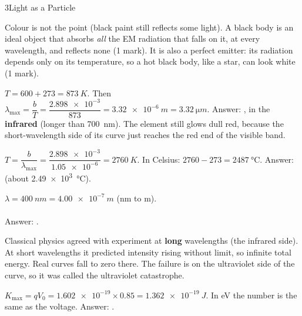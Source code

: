 \begin{chapteranswers}{3}{Light as a Particle}
  \item Colour is not the point (black paint still reflects some light). A black
        body is an ideal object that absorbs \emph{all} the EM radiation that falls on
        it, at every wavelength, and reflects none (1 mark). It is also a perfect
        emitter: its radiation depends only on its temperature, so a hot black body,
        like a star, can look white (1 mark).
  \item $T = 600 + 273 = \qty{873}{K}$. Then
        $\lambda_\mathrm{max} = \dfrac{b}{T} = \dfrac{\num{2.898e-3}}{873}
        = \qty{3.32e-6}{m} = \qty{3.32}{\micro m}$.
        Answer: , in the
        \textbf{infrared} (longer than \qty{700}{nm}). The element still glows dull
        red, because the short-wavelength side of its curve just reaches the red end
        of the visible band.
  \item $T = \dfrac{b}{\lambda_\mathrm{max}} = \dfrac{\num{2.898e-3}}{\num{1.05e-6}}
        = \qty{2760}{K}$. In Celsius: $2760 - 273 = \qty{2487}{\degreeCelsius}$.
        Answer:  (about \qty{2.49e3}{\degreeCelsius}).
  \item $\lambda = \qty{400}{nm} = \qty{4.00e-7}{m}$ (nm to m).\\[2pt]
        \\[3pt]
        Answer: .
  \item Classical physics agreed with experiment at \textbf{long} wavelengths (the
        infrared side). At short wavelengths it predicted intensity rising without
        limit, so infinite total energy. Real curves fall to zero there. The failure
        is on the ultraviolet side of the curve, so it was called the ultraviolet
        catastrophe.
  \item $K_\mathrm{max} = qV_0 = \num{1.602e-19} \times 0.85 = \qty{1.362e-19}{J}$.
        In eV the number is the same as the voltage.
        Answer: .

\end{chapteranswers}
